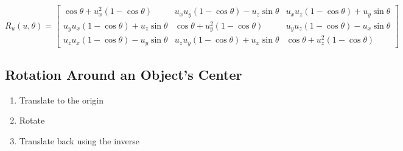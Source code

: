   \begin{equation}
    R_{u}\left( u, \theta \right) =
    \begin{bmatrix}
      \cos\theta + u_{x}^{2}\left( 1 - \cos\theta \right)
      & u_{x} u_{y} \left( 1 - \cos\theta \right) - u_{z} \sin\theta
      & u_{x} u_{z} \left( 1 - \cos\theta \right) + u_{y} \sin\theta \\
      u_{y} u_{x} \left( 1 - \cos\theta \right) + u_{z} \sin\theta
      & \cos\theta + u_{y}^{2}\left( 1 - \cos\theta \right)
      & u_{y} u_{z} \left( 1 - \cos\theta \right) - u_{x} \sin\theta \\
      u_{z} u_{x} \left( 1 - \cos\theta \right) - u_{y} \sin\theta
      & u_{z} u_{y} \left( 1 - \cos\theta \right) + u_{x} \sin\theta
      & \cos\theta + u_{z}^{2}\left( 1 - \cos\theta \right)
    \end{bmatrix}
  \end{equation}

  \subsection{Rotation Around an Object's Center}

    \begin{enumerate}
      \item Translate to the origin
      \item Rotate
      \item Translate back using the inverse
    \end{enumerate}
